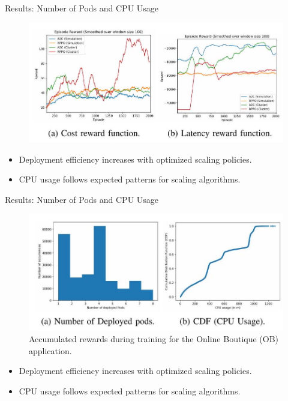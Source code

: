 \documentclass{beamer}
\begin{document}
\begin{frame}{Results: Number of Pods and CPU Usage}
    \begin{figure}
        \includegraphics[width=\textwidth]{images/2024_11_17_21ad14b6196e5740bf69g-7(1).jpg} %
    \end{figure}
    \begin{itemize}
        \item Deployment efficiency increases with optimized scaling policies.
        \item CPU usage follows expected patterns for scaling algorithms.
    \end{itemize}
\end{frame}

\begin{frame}{Results: Number of Pods and CPU Usage}
    \begin{figure}
        \includegraphics[width=\textwidth]{images/2024_11_17_21ad14b6196e5740bf69g-7(2).jpg} %
        \caption*{Accumulated rewards during training for the Online Boutique (OB) application.}
    \end{figure}
    \begin{itemize}
        \item Deployment efficiency increases with optimized scaling policies.
        \item CPU usage follows expected patterns for scaling algorithms.
    \end{itemize}
\end{frame}
\end{document}
